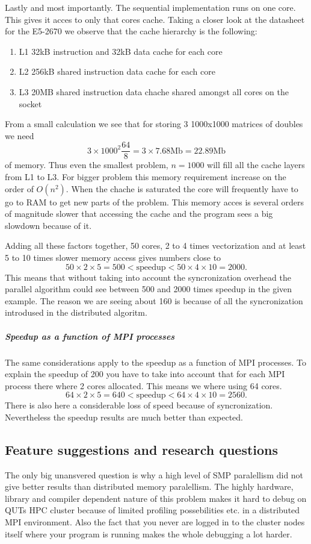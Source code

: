 \documentclass{article}
\begin{document}
Lastly and most importantly. The sequential implementation runs on one core. This
gives it acces to only that cores cache. Taking a closer look at the datasheet
for the E5-2670\cite{intel-datasheet} we observe that the cache hierarchy is
the following:
\begin{enumerate}
		\item L1 32kB instruction and 32kB data cache for each core
		\item L2 256kB shared instruction data cache for each core
		\item L3 20MB shared instruction data chache shared amongst all cores on the socket
\end{enumerate}
From a small calculation we see that for storing 3 1000x1000 matrices of doubles we need
\[
3 \times 1000^2 \frac{64}{8} = 3 \times 7.68 \text{Mb} = 22.89 \text{Mb}
\]
of memory.
Thus even the smallest problem, $n=1000$ will fill all the cache layers from L1 to L3.
For bigger problem this memory requirement increase on the order of $O(n^2)$.
When the chache is saturated the core will frequently have to go to RAM to get new parts of the problem. This memory
acces is several orders of magnitude slower that accessing the cache and the program sees a big
slowdown because of it.

Adding all these factors together, 50 cores, 2 to 4 times vectorization and at least 5 to 10 times slower memory access
gives numbers close to
\[
50 \times 2 \times 5 = 500 < \text{speedup} < 50 \times 4 \times 10 = 2000.
\]
This means that without taking into account the syncronization overhead
the parallel algorithm could see between 500 and 2000 times speedup in the given example.
The reason we are seeing about 160 is because
of all the syncronization introdused in the distributed algoritm.

\subparagraph{Speedup as a function of MPI processes}
The same considerations apply to the speedup as a function of MPI processes.
To explain the speedup of 200 you have to take into account that for each MPI
process there where 2 cores allocated. This means we where using 64 cores.
\[
64 \times 2 \times 5 = 640 < \text{speedup} < 64 \times 4 \times 10 = 2560.
\]
There is also here a considerable loss of speed because of syncronization.
Nevertheless the speedup results are much better than expected.

\subsection{Feature suggestions and research questions}
The only big unansvered question is why a high level of SMP paralellism did not give better
results than distributed memory paralellism. The highly hardware,
library and compiler dependent nature of this problem makes it hard
to debug on QUTs HPC cluster because of limited profiling possebilities
etc. in a distributed MPI environment. Also the fact that you never are
logged in to the cluster nodes itself where your program is running makes
the whole debugging a lot harder.
\end{document}
